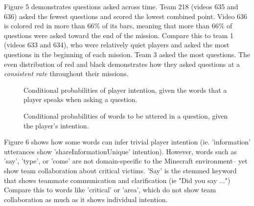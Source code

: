 Figure 5 demonstrates questions asked across time. Team 218 (videos 635 and 636) asked the fewest questions and scored the lowest combined point. Video 636 is colored red in more than 66\% of its bars, meaning that more than 66\% of questions were asked toward the end of the mission. Compare this to team 1 (videos 633 and 634), who were relatively quiet players and asked the most questions in the beginning of each mission. Team 3 asked the most questions. The even distribution of red and black demonstrates how they asked questions at a \emph{consistent rate} throughout their missions.


\begin{figure}[h!]
    \centering
    \caption{Conditional probabilities of player intention, given the words that a player speaks when asking a question.}
    \end{figure}
    
\begin{figure}[h!]
    \centering
    \caption{Conditional probabilities of words to be uttered in a question, given the player's intention.}
    \end{figure}
    Figure 6 shows how some words can infer trivial player intention (ie. 'information' utterances show 'shareInformationUnique' intention). However, words such as 'say', 'type', or 'come' are not domain-specific to the Minecraft environment-- yet show team collaboration about critical victims. 'Say' is the stemmed keyword that shows teammate communication and clarification (ie "Did you say ...") Compare this to words like 'critical' or 'area', which do not show team collaboration as much as it shows individual intention.  
    
